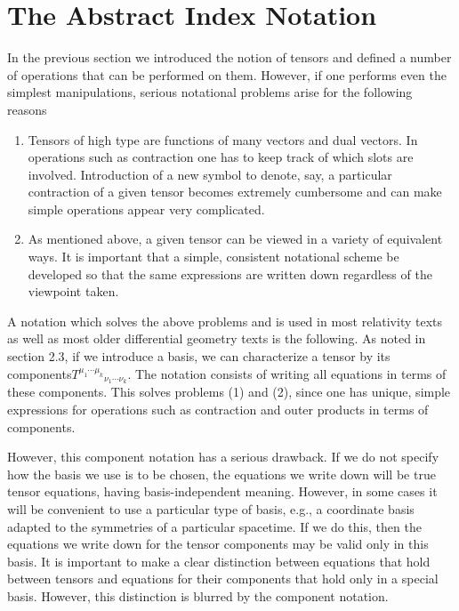 \section{The Abstract Index Notation}
In the previous section we introduced the notion of tensors and defined a number of operations that can be performed on them. However, if one performs even the simplest manipulations, serious notational problems arise for the following reasons
\begin{enumerate}[label=(\arabic*)]
    \item Tensors of high type are functions of many vectors and dual vectors. In operations such as contraction one has to keep track of which slots are involved. Introduction of a new symbol to denote, say, a particular contraction of a given tensor becomes extremely cumbersome and can make simple operations appear very complicated.
    \item As mentioned above, a given tensor can be viewed in a variety of equivalent ways. It is important that a simple, consistent notational scheme be developed so that the same expressions are written down regardless of the viewpoint taken.
\end{enumerate}

A notation which solves the above problems and is used in most relativity texts as well as most older differential geometry texts is the following. As noted in section 2.3, if we introduce a basis, we can characterize a tensor by its components${T^{\mu_1\cdots\mu_k}}_{\nu_1\cdots\nu_k}$. The notation consists of writing all equations in terms of these components. This solves problems (1) and (2), since one has unique, simple expressions for operations such as contraction and outer products in terms of components.

However, this component notation has a serious drawback. If we do not specify how the basis we use is to be chosen, the equations we write down will be true tensor equations, having basis-independent meaning. However, in some cases it will be convenient to use a particular type of basis, e.g., a coordinate basis adapted to the symmetries of a particular spacetime. If we do this, then the equations we write down for the tensor components may be valid only in this basis. It is important to make a clear distinction between equations that hold between tensors and equations for their components that hold only in a special basis. However, this distinction is blurred by the component notation.

